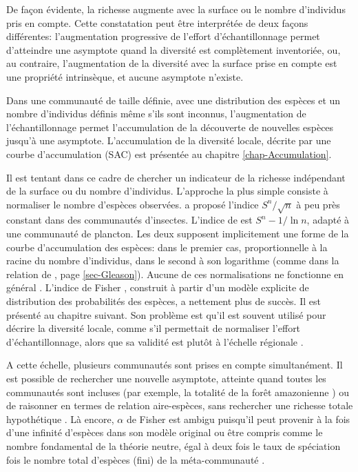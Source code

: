 \documentclass[
  11pt,
  french,
  a4paper,
  extrafontsizes,onecolumn,openright
  ]{memoir}
\newlength{\rf}
\begin{document}
De façon évidente, la richesse augmente avec la surface ou le nombre d'individus pris en compte.
Cette constatation peut être interprétée de deux façons différentes: l'augmentation progressive de l'effort d'échantillonnage permet d'atteindre une asymptote quand la diversité est complètement inventoriée, ou, au contraire, l'augmentation de la diversité avec la surface prise en compte est une propriété intrinsèque, et aucune asymptote n'existe.

Dans une communauté de taille définie, avec une distribution des espèces et un nombre d'individus définis même s'ils sont inconnus, l'augmentation de l'échantillonnage permet l'accumulation de la découverte de nouvelles espèces jusqu'à une asymptote.
L'accumulation de la diversité locale, décrite par une courbe d'accumulation (SAC) est présentée au chapitre \ref{chap-Accumulation}.

Il est tentant dans ce cadre de chercher un indicateur de la richesse indépendant de la surface ou du nombre d'individus.
L'approche la plus simple consiste à normaliser le nombre d'espèces observées.
\textcite{Menhinick1964} a proposé l'indice \({S^{n}}/{\sqrt{n}}\) à peu près constant dans des communautés d'insectes.
L'indice de \textcite{Margalef1958a} est \({S^{n} -1}/{\ln{n}}\), adapté à une communauté de plancton.
Les deux supposent implicitement une forme de la courbe d'accumulation des espèces: dans le premier cas, proportionnelle à la racine du nombre d'individus, dans le second à son logarithme (comme dans la relation de \textcite{Gleason1922}, page \ref{sec-Gleason}).
Aucune de ces normalisations ne fonctionne en général \autocite[p.~77]{Magurran2004}.
L'indice de Fisher \autocite{Fisher1943}, construit à partir d'un modèle explicite de distribution des probabilités des espèces, a nettement plus de succès.
Il est présenté au chapitre suivant.
Son problème est qu'il est souvent utilisé pour décrire la diversité locale, comme s'il permettait de normaliser l'effort d'échantillonnage, alors que sa validité est plutôt à l'échelle régionale \autocite{Hubbell2001}.

A cette échelle, plusieurs communautés sont prises en compte simultanément.
Il est possible de rechercher une nouvelle asymptote, atteinte quand toutes les communautés sont incluses (par exemple, la totalité de la forêt amazonienne \autocite{TerSteege2013}) ou de raisonner en termes de relation aire-espèces, sans rechercher une richesse totale hypothétique \autocite{Preston1960}.
Là encore, \(\alpha\) de Fisher est ambigu puisqu'il peut provenir à la fois d'une infinité d'espèces dans son modèle original ou être compris comme le nombre fondamental de la théorie neutre, égal à deux fois le taux de spéciation fois le nombre total d'espèces (fini) de la méta-communauté \autocite{Hubbell2001}.
\end{document}
